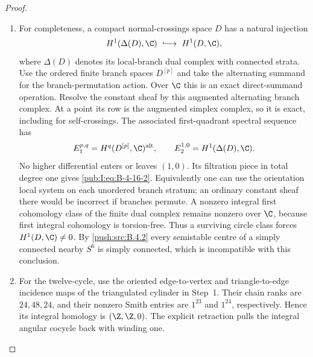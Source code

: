 \begin{proof}
\begin{enumerate}[label=\arabic*.,leftmargin=*]
\item For completeness, a compact normal-crossings space $D$
has a natural injection
\begin{equation}
 H^1(\Delta(D),\C)\ \lhook\joinrel\longrightarrow\
 H^1(D,\C),
\label{pub:I:eq:B-4-16-2}
\end{equation}
where $\Delta(D)$ denotes its local-branch dual
complex with connected strata. Use the ordered finite
branch spaces $D^{[p]}$ and take the alternating
summand for the branch-permutation action. Over $\C$
this is an exact direct-summand operation. Resolve the
constant sheaf by this augmented alternating branch
complex. At a point its row is the augmented simplex
complex, so it is exact, including for self-crossings.
The associated first-quadrant spectral sequence has
\[
 E_1^{p,q}=H^q(D^{[p]},\C)^{\mathrm{alt}},
 \qquad
 E_2^{1,0}=H^1(\Delta(D),\C).
\]
No higher differential enters or leaves $(1,0)$.
Its filtration piece in total degree one gives
\eqref{pub:I:eq:B-4-16-2}. Equivalently one can use the orientation
local system on each unordered branch stratum; an
ordinary constant sheaf there would be incorrect if
branches permute. A nonzero integral first cohomology
class of the finite dual complex remains nonzero over
$\C$, because first integral cohomology is torsion-free.
Thus a surviving circle class forces $H^1(D,\C)\ne0$.
By \ref{push:src:B.4.2} every semistable centre of
a simply connected nearby $S^6$ is simply connected,
which is incompatible with this conclusion.

\item For the twelve-cycle, use the oriented edge-to-vertex and
triangle-to-edge incidence maps of the triangulated cylinder in Step~1.
Their chain ranks are $24,48,24$, and their nonzero Smith entries are
$1^{23}$ and $1^{24}$, respectively. Hence its integral homology is
$(\Z,\Z,0)$. The explicit retraction pulls the integral angular cocycle
back with winding one.
\end{enumerate}
\end{proof}
